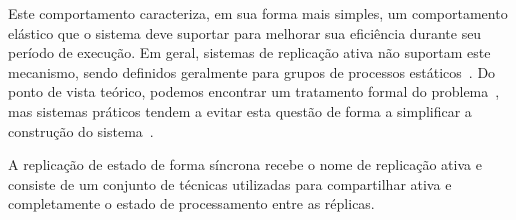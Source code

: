 Este comportamento  caracteriza, em sua forma mais simples, um comportamento elástico que
o sistema deve suportar para melhorar sua eficiência durante seu período de execução. Em
geral, sistemas de replicação ativa não suportam este mecanismo, sendo definidos
geralmente para grupos  de processos estáticos~\cite{chandra96, lamport98}. Do ponto de
vista teórico, podemos encontrar um tratamento formal do problema~\cite{lamport10}, mas
sistemas práticos tendem a evitar esta questão de forma a simplificar a construção do
sistema~\cite{chandra07}.

A replicação de estado de forma síncrona recebe o nome de replicação ativa e consiste de
um conjunto de técnicas utilizadas para compartilhar ativa e completamente o estado de
processamento entre as réplicas.
